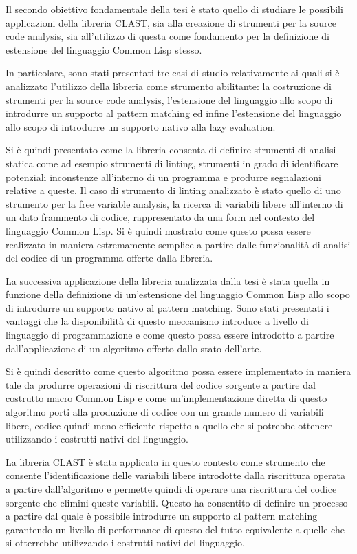 \documentclass{book}
\begin{document}
Il secondo obiettivo fondamentale della tesi è stato quello di studiare le
possibili applicazioni della libreria CLAST, sia alla creazione di strumenti per
la source code analysis, sia all'utilizzo di questa come fondamento per la
definizione di estensione del linguaggio Common Lisp stesso.

In particolare, sono stati presentati tre casi di studio relativamente ai quali
si è analizzato l'utilizzo della libreria come strumento abilitante: la
costruzione di strumenti per la source code analysis, l'estensione del
linguaggio allo scopo di introdurre un supporto al pattern matching ed infine
l'estensione del linguaggio allo scopo di introdurre un supporto nativo alla
lazy evaluation.

Si è quindi presentato come la libreria consenta di definire strumenti di
analisi statica come ad esempio strumenti di linting, strumenti in grado di
identificare potenziali inconstenze all'interno di un programma e produrre
segnalazioni relative a queste. Il caso di strumento di linting analizzato è
stato quello di uno strumento per la free variable analysis, la ricerca di
variabili libere all'interno di un dato frammento di codice, rappresentato da
una form nel contesto del linguaggio Common Lisp. Si è quindi mostrato come
questo possa essere realizzato in maniera estremamente semplice a partire dalle
funzionalità di analisi del codice di un programma offerte dalla libreria.

La successiva applicazione della libreria analizzata dalla tesi è stata quella
in funzione della definizione di un'estensione del linguaggio Common Lisp allo
scopo di introdurre un supporto nativo al pattern matching. Sono stati
presentati i vantaggi che la disponibilità di questo meccanismo introduce a
livello di linguaggio di programmazione e come questo possa essere introdotto a
partire dall'applicazione di un algoritmo offerto dallo stato dell'arte.

Si è quindi descritto come questo algoritmo possa essere implementato in maniera
tale da produrre operazioni di riscrittura del codice sorgente a partire dal
costrutto macro Common Lisp e come un'implementazione diretta di questo
algoritmo porti alla produzione di codice con un grande numero di variabili
libere, codice quindi meno efficiente rispetto a quello che si potrebbe ottenere
utilizzando i costrutti nativi del linguaggio.

La libreria CLAST è stata applicata in questo contesto come strumento che
consente l'identificazione delle variabili libere introdotte dalla riscrittura
operata a partire dall'algoritmo e permette quindi di operare una riscrittura
del codice sorgente che elimini queste variabili. Questo ha consentito di
definire un processo a partire dal quale è possibile introdurre un supporto al
pattern matching garantendo un livello di performance di questo del tutto
equivalente a quelle che si otterrebbe utilizzando i costrutti nativi del
linguaggio.
\end{document}
